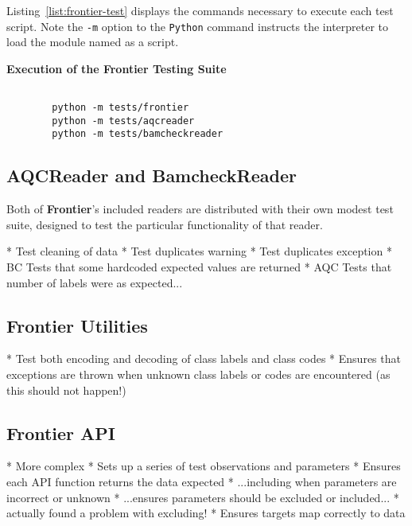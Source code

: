 Listing~\ref{list:frontier-test} displays the commands necessary to execute each
test script. Note the \texttt{-m} option to the \texttt{Python} command
instructs the interpreter to load the module named as a script.

\begin{listing}[H]
    \caption[frontier-test]{\textbf{Execution of the Frontier Testing Suite}}
    \label{list:frontier-test}
    \begin{verbatim}

        python -m tests/frontier
        python -m tests/aqcreader
        python -m tests/bamcheckreader
    \end{verbatim}
\end{listing}

\subsection{AQCReader and BamcheckReader}

Both of \textbf{Frontier}'s included readers are distributed with their own
modest test suite, designed to test the particular functionality of that reader.


* Test cleaning of data
* Test duplicates warning
* Test duplicates exception
* BC Tests that some hardcoded expected values are returned
* AQC Tests that number of labels were as expected...

\subsection{Frontier Utilities}

* Test both encoding and decoding of class labels and class codes
* Ensures that exceptions are thrown when unknown class labels or codes are
encountered (as this should not happen!)

\subsection{Frontier API}
* More complex
* Sets up a series of test observations and parameters
* Ensures each API function returns the data expected
* ...including when parameters are incorrect or unknown
* ...ensures parameters should be excluded or included...
* actually found a problem with excluding!
* Ensures targets map correctly to data


